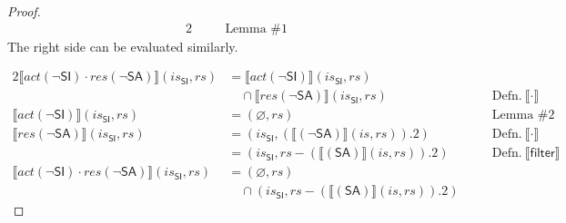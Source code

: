 \documentclass[12pt, letterpaper]{article}
\let\emptyset\varnothing
\newcommand\interp[1]{\llbracket #1 \rrbracket}
\begin{document}
\begin{proof}
{\begin{alignat}{2}
     &&\quad \text{Lemma \#1}
 \end{alignat}
 }%
     The right side can be evaluated similarly.
 \par\nobreak
 {\fontsize{10pt}{12pt}\selectfont
 \begin{alignat}{2}
     \label{3.2.1:step6}
     \interp{ \mathit{act}(\neg\mathsf{SI}) \cdot
      \mathit{res}(\neg\mathsf{SA}) } (\mathit{is_{\mathsf{SI}}}, \mathit{rs})
     &=
     \interp{ \mathit{act}(\neg\mathsf{SI}) } (\mathit{is_{\mathsf{SI}}}, \mathit{rs})\\ %
     \nonumber
     &\quad \cap
     \interp{ \mathit{res}(\neg\mathsf{SA}) } (\mathit{is_{\mathsf{SI}}}, \mathit{rs})
     &&\quad \text{Defn.}\ \interp{\cdot}
     \\ %
     \label{3.2.1:step7}
     \interp{ \mathit{act}(\neg\mathsf{SI}) } (\mathit{is_{\mathsf{SI}}}, \mathit{rs})
     &=
     (\emptyset, \mathit{rs})
     &&\quad \text{Lemma \#2}
     \\
     \label{3.2.1:step8}
     \interp{ \mathit{res}(\neg\mathsf{SA}) } (\mathit{is_{\mathsf{SI}}}, \mathit{rs})
     &=
     (\mathit{is_{\mathsf{SI}}}, (\interp{ (\neg\mathsf{SA}) } (\mathit{is}, \mathit{rs})).2)
     &&\quad \text{Defn.}\ \interp{\cdot}
     \\
     \label{3.2.1:step9}
     &=
     (\mathit{is_{\mathsf{SI}}}, \mathit{rs} - (\interp{ (\mathsf{SA}) } (\mathit{is}, \mathit{rs})).2)
     &&\quad \text{Defn.}\ \interp{\mathsf{filter}}
     \\
     \label{3.2.1:step10}
     \interp{ \mathit{act}(\neg\mathsf{SI}) \cdot
      \mathit{res}(\neg\mathsf{SA}) } (\mathit{is_{\mathsf{SI}}}, \mathit{rs})
     &=
     (\emptyset, \mathit{rs})
     \\
     \nonumber
     &\quad \cap
     (\mathit{is_{\mathsf{SI}}}, \mathit{rs} - (\interp{ (\mathsf{SA}) } (\mathit{is}, \mathit{rs})).2)

\end{alignat}}
\end{proof}
\end{document}
